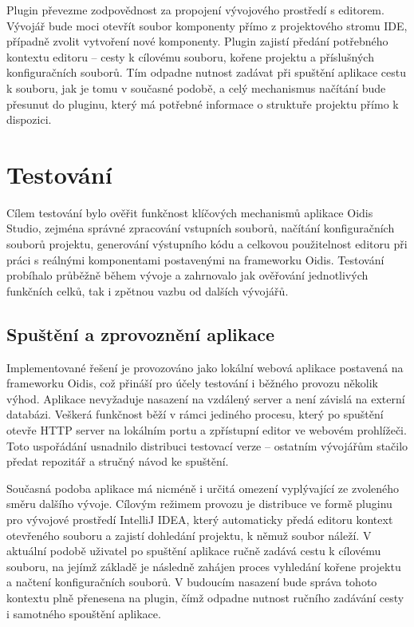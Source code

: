 Plugin převezme zodpovědnost za propojení vývojového prostředí s editorem. Vývojář bude moci otevřít soubor komponenty přímo z projektového stromu IDE, případně zvolit vytvoření nové komponenty. Plugin zajistí předání potřebného kontextu editoru -- cesty k cílovému souboru, kořene projektu a příslušných konfiguračních souborů. Tím odpadne nutnost zadávat při spuštění aplikace cestu k souboru, jak je tomu v současné podobě, a celý mechanismus načítání bude přesunut do pluginu, který má potřebné informace o struktuře projektu přímo k dispozici.

\chapter{Testování}
\label{Testovani}

Cílem testování bylo ověřit funkčnost klíčových mechanismů aplikace Oidis Studio, zejména správné zpracování vstupních souborů, načítání konfiguračních souborů projektu, generování výstupního kódu a celkovou použitelnost editoru při práci s reálnými komponentami postavenými na frameworku Oidis. Testování probíhalo průběžně během vývoje a zahrnovalo jak ověřování jednotlivých funkčních celků, tak i zpětnou vazbu od dalších vývojářů.

\section{Spuštění a zprovoznění aplikace}
Implementované řešení je provozováno jako lokální webová aplikace postavená na frameworku Oidis, což přináší pro účely testování i běžného provozu několik výhod. Aplikace nevyžaduje nasazení na vzdálený server a není závislá na externí databázi. Veškerá funkčnost běží v rámci jediného procesu, který po spuštění otevře HTTP server na lokálním portu a zpřístupní editor ve webovém prohlížeči. Toto uspořádání usnadnilo distribuci testovací verze -- ostatním vývojářům stačilo předat repozitář a stručný návod ke spuštění.

Současná podoba aplikace má nicméně i určitá omezení vyplývající ze zvoleného směru dalšího vývoje. Cílovým režimem provozu je distribuce ve formě pluginu pro vývojové prostředí IntelliJ IDEA, který automaticky předá editoru kontext otevřeného souboru a zajistí dohledání projektu, k němuž soubor náleží. V aktuální podobě uživatel po spuštění aplikace ručně zadává cestu k cílovému souboru, na jejímž základě je následně zahájen proces vyhledání kořene projektu a načtení konfiguračních souborů. V budoucím nasazení bude správa tohoto kontextu plně přenesena na plugin, čímž odpadne nutnost ručního zadávání cesty i samotného spouštění aplikace.

